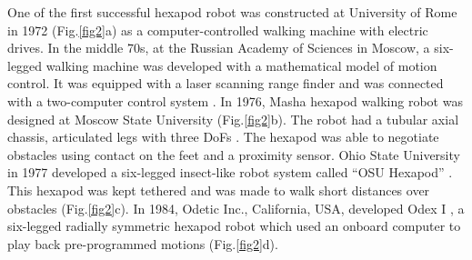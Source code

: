 One of the first successful hexapod robot was constructed at University of Rome in 1972 (Fig.\ref{fig2}a) as a computer-controlled walking machine with electric drives\cite{12h}. In the middle 70s, at the Russian Academy of Sciences in Moscow, a six-legged walking machine was developed with a mathematical model of motion control. It was equipped with a laser scanning range finder and was connected with a two-computer control system \cite{13h}. In 1976, Masha hexapod walking robot was designed at Moscow State University (Fig.\ref{fig2}b). The robot had a tubular axial chassis, articulated legs with three DoFs \cite{14h}. The hexapod was able to negotiate obstacles using contact on the feet and a proximity sensor. Ohio State University in 1977 developed a six-legged insect-like robot system called “OSU Hexapod” \cite{15h}. This hexapod was kept tethered and was made to walk short distances over obstacles (Fig.\ref{fig2}c).
In 1984, Odetic Inc., California, USA, developed Odex I \cite{17h}, a six-legged radially symmetric hexapod robot which used an onboard computer to play back pre-programmed motions (Fig.\ref{fig2}d).


